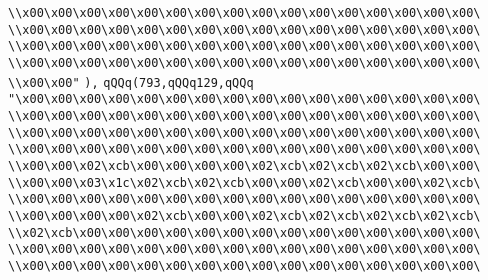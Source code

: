 \verb|\\x00\x00\x00\x00\x00\x00\x00\x00\x00\x00\x00\x00\x00\x00\x00\x00\|\newline
\verb|\\x00\x00\x00\x00\x00\x00\x00\x00\x00\x00\x00\x00\x00\x00\x00\x00\|\newline
\verb|\\x00\x00\x00\x00\x00\x00\x00\x00\x00\x00\x00\x00\x00\x00\x00\x00\|\newline
\verb|\\x00\x00\x00\x00\x00\x00\x00\x00\x00\x00\x00\x00\x00\x00\x00\x00\|\newline
\verb|\\x00\x00"|\newline
\verb|),|\newline
\verb|qQQq(793,qQQq129,qQQq|\newline
\verb|"\x00\x00\x00\x00\x00\x00\x00\x00\x00\x00\x00\x00\x00\x00\x00\x00\|\newline
\verb|\\x00\x00\x00\x00\x00\x00\x00\x00\x00\x00\x00\x00\x00\x00\x00\x00\|\newline
\verb|\\x00\x00\x00\x00\x00\x00\x00\x00\x00\x00\x00\x00\x00\x00\x00\x00\|\newline
\verb|\\x00\x00\x00\x00\x00\x00\x00\x00\x00\x00\x00\x00\x00\x00\x00\x00\|\newline
\verb|\\x00\x00\x02\xcb\x00\x00\x00\x00\x02\xcb\x02\xcb\x02\xcb\x00\x00\|\newline
\verb|\\x00\x00\x03\x1c\x02\xcb\x02\xcb\x00\x00\x02\xcb\x00\x00\x02\xcb\|\newline
\verb|\\x00\x00\x00\x00\x00\x00\x00\x00\x00\x00\x00\x00\x00\x00\x00\x00\|\newline
\verb|\\x00\x00\x00\x00\x02\xcb\x00\x00\x02\xcb\x02\xcb\x02\xcb\x02\xcb\|\newline
\verb|\\x02\xcb\x00\x00\x00\x00\x00\x00\x00\x00\x00\x00\x00\x00\x00\x00\|\newline
\verb|\\x00\x00\x00\x00\x00\x00\x00\x00\x00\x00\x00\x00\x00\x00\x00\x00\|\newline
\verb|\\x00\x00\x00\x00\x00\x00\x00\x00\x00\x00\x00\x00\x00\x00\x00\x00\|\newline
